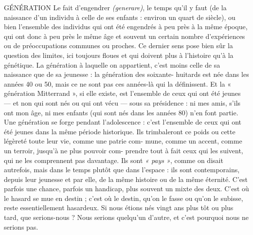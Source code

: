 GÉNÉRATION Le fait d’engendrer {\it (generare)}, le temps qu’il y faut (de la
naissance d’un individu à celle de ses enfants : environ un
quart de siècle), ou bien l’ensemble des individus qui ont été engendrés à peu
près à la même époque, qui ont donc à peu près le même âge et souvent un certain
nombre d’expériences ou de préoccupations communes ou proches. Ce
dernier sens pose bien sûr la question des limites, ici toujours floues et qui doivent
plus à l’histoire qu’à la génétique. La génération à laquelle on appartient,
c’est moins celle de sa naissance que de sa jeunesse : la génération des soixante-
huitards est née dans les années 40 ou 50, mais ce ne sont pas ces années-là qui
la définissent. Et la « génération Mitterrand », si elle existe, est l’ensemble de
ceux qui ont été jeunes — et non qui sont nés ou qui ont vécu — sous sa
présidence : ni mes amis, s’ils ont mon âge, ni mes enfants (qui sont nés dans
les années 80) n’en font partie. Une génération se forge pendant l’adolescence :
c’est l’ensemble de ceux qui ont été jeunes dans la même période historique. Ils
trimbaleront ce poids ou cette légèreté toute leur vie, comme une patrie com-
mune, comme un accent, comme un terroir, jusqu'à ne plus pouvoir com-
prendre tout à fait ceux qui les suivent, qui ne les comprennent pas davantage.
Ils sont {\it « pays »}, comme on disait autrefois, mais dans le temps plutôt que dans
l’espace : ils sont contemporains, depuis leur jeunesse et par elle, de la même
histoire ou de la même éternité. C’est parfois une chance, parfois un handicap,
plus souvent un mixte des deux. C’est où le hasard se mue en destin ; c’est où
le destin, qu’on le fasse ou qu’on le subisse, reste essentiellement hasardeux. Si
nous étions nés vingt ans plus tôt ou plus tard, que serions-nous ? Nous serions
quelqu’un d’autre, et c’est pourquoi nous ne serions pas.

